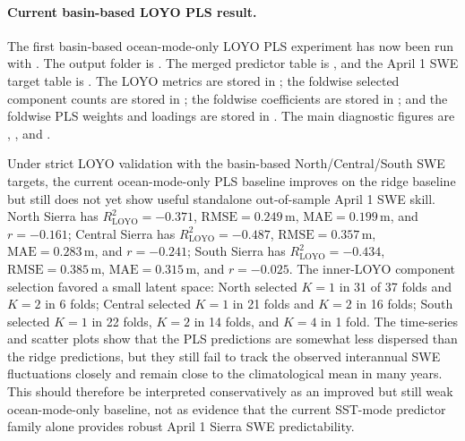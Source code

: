 \documentclass[11pt]{article}
\begin{document}
\paragraph{Current basin-based LOYO PLS result.}
The first basin-based ocean-mode-only LOYO PLS experiment has now been run with
. The output folder is
. The merged predictor table is
,
and the April 1 SWE target table is
.
The LOYO metrics are stored in
; the foldwise
selected component counts are stored in
; the
foldwise coefficients are stored in
; and
the foldwise PLS weights and loadings are stored in
. The
main diagnostic figures are ,
, and
.

Under strict LOYO validation with the basin-based North/Central/South SWE targets, the current
ocean-mode-only PLS baseline improves on the ridge baseline but still does not yet show useful
standalone out-of-sample April 1 SWE skill. North Sierra has
$R^2_{\mathrm{LOYO}}=-0.371$, $\mathrm{RMSE}=0.249\,\mathrm{m}$,
$\mathrm{MAE}=0.199\,\mathrm{m}$, and $r=-0.161$; Central Sierra has
$R^2_{\mathrm{LOYO}}=-0.487$, $\mathrm{RMSE}=0.357\,\mathrm{m}$,
$\mathrm{MAE}=0.283\,\mathrm{m}$, and $r=-0.241$; South Sierra has
$R^2_{\mathrm{LOYO}}=-0.434$, $\mathrm{RMSE}=0.385\,\mathrm{m}$,
$\mathrm{MAE}=0.315\,\mathrm{m}$, and $r=-0.025$. The inner-LOYO component selection favored a
small latent space: North selected $K=1$ in 31 of 37 folds and $K=2$ in 6 folds; Central selected
$K=1$ in 21 folds and $K=2$ in 16 folds; South selected $K=1$ in 22 folds, $K=2$ in 14 folds, and
$K=4$ in 1 fold. The time-series and scatter plots show that the PLS predictions are somewhat less
dispersed than the ridge predictions, but they still fail to track the observed interannual SWE
fluctuations closely and remain close to the climatological mean in many years. This should
therefore be interpreted conservatively as an improved but still weak ocean-mode-only baseline, not
as evidence that the current SST-mode predictor family alone provides robust April 1 Sierra SWE
predictability.
\end{document}
